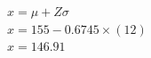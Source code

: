 \documentclass[11pt, chapterprefix=true]{scrbook}\usepackage[]{graphicx}\usepackage[]{color}
\begin{document}
\begin{exercises}
\begin{exercise}
	\end{exercise}
	\begin{solution}  %

	    $x = \mu + Z \sigma$ \\
	    $x = 155 - 0.6745 \times (12) $ \\
	    $x = 146.91$

  \end{solution}
  

%
%
%
%

\end{exercises}
\end{document}
